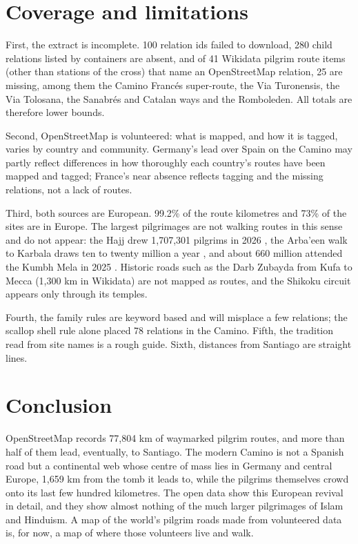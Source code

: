 \documentclass[11pt,a4paper]{article}
\begin{document}
\section{Coverage and limitations}\label{sec:cov}
First, the extract is incomplete. 100 relation ids failed to download, 280 child relations listed by containers are absent, and of 41 Wikidata pilgrim route items (other than stations of the cross) that name an OpenStreetMap relation, 25 are missing, among them the Camino Francés super-route, the Via Turonensis, the Via Tolosana, the Sanabrés and Catalan ways and the Romboleden. All totals are therefore lower bounds.

Second, OpenStreetMap is volunteered: what is mapped, and how it is tagged, varies by country and community. Germany's lead over Spain on the Camino may partly reflect differences in how thoroughly each country's routes have been mapped and tagged; France's near absence reflects tagging and the missing relations, not a lack of routes.

Third, both sources are European. 99.2\% of the route kilometres and 73\% of the sites are in Europe. The largest pilgrimages are not walking routes in this sense and do not appear: the Hajj drew 1,707,301 pilgrims in 2026 \citep{wikihajj}, the Arba'een walk to Karbala draws ten to twenty million a year \citep{wikiarbaeen}, and about 660 million attended the Kumbh Mela in 2025 \citep{wikikumbh}. Historic roads such as the Darb Zubayda from Kufa to Mecca (1,300 km in Wikidata) are not mapped as routes, and the Shikoku circuit appears only through its temples.

Fourth, the family rules are keyword based and will misplace a few relations; the scallop shell rule alone placed 78 relations in the Camino. Fifth, the tradition read from site names is a rough guide. Sixth, distances from Santiago are straight lines.

\section{Conclusion}
OpenStreetMap records 77,804 km of waymarked pilgrim routes, and more than half of them lead, eventually, to Santiago. The modern Camino is not a Spanish road but a continental web whose centre of mass lies in Germany and central Europe, 1,659 km from the tomb it leads to, while the pilgrims themselves crowd onto its last few hundred kilometres. The open data show this European revival in detail, and they show almost nothing of the much larger pilgrimages of Islam and Hinduism. A map of the world's pilgrim roads made from volunteered data is, for now, a map of where those volunteers live and walk.
\end{document}
